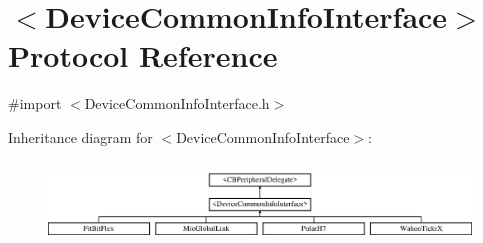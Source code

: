 \hypertarget{protocol_device_common_info_interface-p}{\section{$<$Device\-Common\-Info\-Interface$>$ Protocol Reference}
\label{protocol_device_common_info_interface-p}
}


{\ttfamily \#import $<$Device\-Common\-Info\-Interface.\-h$>$}

Inheritance diagram for $<$Device\-Common\-Info\-Interface$>$\-:\begin{figure}[H]
\begin{center}
\leavevmode
\includegraphics[height=2.176166cm]{protocol_device_common_info_interface-p}
\end{center}
\end{figure}
